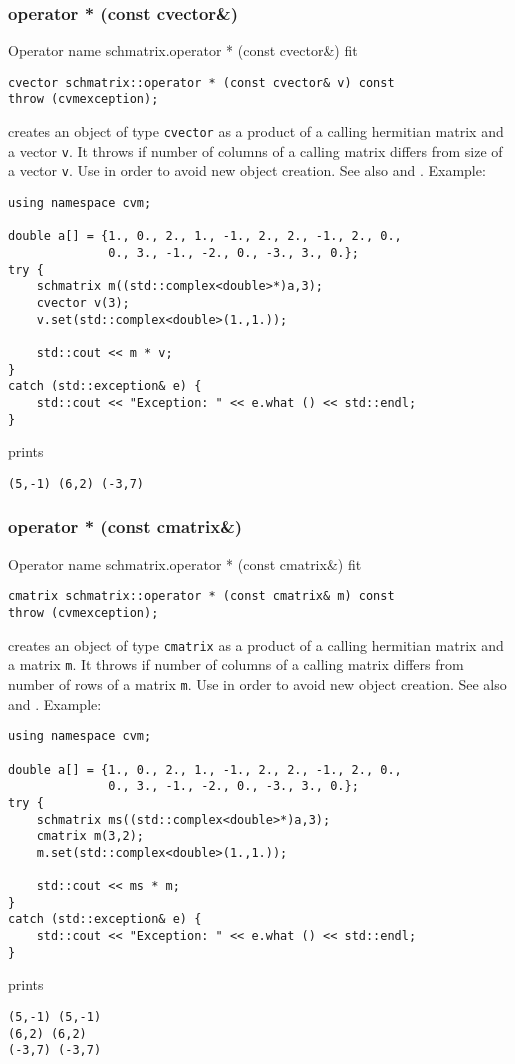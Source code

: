 \subsubsection{operator * (const cvector\&)}
Operator%
\pdfdest name {schmatrix.operator * (const cvector&)} fit
\begin{verbatim}
cvector schmatrix::operator * (const cvector& v) const
throw (cvmexception);
\end{verbatim}
creates an object of type \verb"cvector"
as a product of a calling hermitian matrix and a vector \verb"v".
It throws  
if  number of columns of a calling matrix
differs from  size of a vector \verb"v".
Use 
in order to avoid new object creation.
See also
 and .
Example:
\begin{Verbatim}
using namespace cvm;

double a[] = {1., 0., 2., 1., -1., 2., 2., -1., 2., 0.,
              0., 3., -1., -2., 0., -3., 3., 0.};
try {
    schmatrix m((std::complex<double>*)a,3);
    cvector v(3);
    v.set(std::complex<double>(1.,1.));

    std::cout << m * v;
}
catch (std::exception& e) {
    std::cout << "Exception: " << e.what () << std::endl;
}
\end{Verbatim}
prints
\begin{Verbatim}
(5,-1) (6,2) (-3,7)
\end{Verbatim}
\newpage



\subsubsection{operator * (const cmatrix\&)}
Operator%
\pdfdest name {schmatrix.operator * (const cmatrix&)} fit
\begin{verbatim}
cmatrix schmatrix::operator * (const cmatrix& m) const
throw (cvmexception);
\end{verbatim}
creates an object of type \verb"cmatrix"
as a product of a calling hermitian matrix and a matrix \verb"m".
It throws  
if  number of columns of a calling matrix
differs from  number of rows of a matrix \verb"m".
Use  in order to avoid
 new object creation.
See also
 and .
Example:
\begin{Verbatim}
using namespace cvm;

double a[] = {1., 0., 2., 1., -1., 2., 2., -1., 2., 0.,
              0., 3., -1., -2., 0., -3., 3., 0.};
try {
    schmatrix ms((std::complex<double>*)a,3);
    cmatrix m(3,2);
    m.set(std::complex<double>(1.,1.));

    std::cout << ms * m;
}
catch (std::exception& e) {
    std::cout << "Exception: " << e.what () << std::endl;
}
\end{Verbatim}
prints
\begin{Verbatim}
(5,-1) (5,-1)
(6,2) (6,2)
(-3,7) (-3,7)
\end{Verbatim}
\newpage




